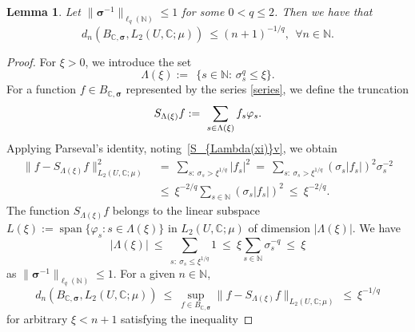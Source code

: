 \documentclass[11pt]{article}
\newtheorem{lemma}{Lemma}[section]
\numberwithin{equation}{section}
\theoremstyle{definition}
\theoremstyle{remark}
\newcommand{\bsigma}{{\boldsymbol{\sigma}}}
\def\NN{{\mathbb N}}
\def\CC{{\mathbb C}}
\def\CC{{\mathbb C}}
\def\NN{{\mathbb N}}
\def\CC{{\mathbb C}}
\def\NN{{\mathbb N}}
\begin{document}
{
\begin{lemma} \label{lemma:d_n><}
Let $\|\bsigma^{-1}\|_{\ell_q(\NN)} \le 1$ for some $0 < q \le 2$.	Then we have that
	\begin{equation} \label{d_n><}
		d_n(B_{\CC,\bsigma},L_2(U,\CC;\mu))
        \ \le (n+1)^{-1/q}, \ \ \forall n \in \NN.
	\end{equation}
\end{lemma}	

\begin{proof}	
	For $\xi>0$, we introduce the set 	
	\begin{equation*} \label{Lambda_sigma(xi)}
\Lambda(\xi)
	:= \ 
	\ \big\{s \in \NN: \, \sigma_s^{q} \le \xi \big\}.
\end{equation*}
 For a function $f \in B_{\CC,\bsigma}$
	represented by the series \eqref{series}, we define the truncation 
	\begin{equation} \label{S_{Lambda(xi)}v}
		S_{\Lambda(\xi)} f 
		:= \ 
		\sum_{s\in {\Lambda(\xi)}} f_s \varphi_s.
	\end{equation}	
	Applying Parseval's identity, 
	noting~\eqref{S_{Lambda(xi)}v}, we obtain 
		\begin{equation} \nonumber
		\begin{split}
			\|f- S_{\Lambda(\xi)}f\|_{L_2(U,\CC;\mu)}^2 
			\ & {=} \
            \sum_{s: \ \sigma_{s}> \xi^{1/q} } |f_s|^2 
			\ = \
            \sum_{s: \ \sigma_{s}> \xi^{1/q} } (\sigma_{s}|f_s|)^2 \sigma_{s}^{-2}
			\\[1.5ex]
			\ &\le \
			\xi^{-2/q}
			\sum_{s \in \NN} (\sigma_{s}|f_s|)^2 
			\ \le \ \xi^{-2/q}.
		\end{split}
	\end{equation} 
The function $S_{\Lambda(\xi)}f$ belongs to the linear subspace 
$L(\xi):= \operatorname{span}\{\varphi_s: s \in \Lambda(\xi)\}$ in $L_2(U,\CC;\mu)$ of dimension $|\Lambda(\xi)|$. We have
\begin{equation} \nonumber
	|\Lambda(\xi)|
	\ \le \ 
    \sum_{s: \ \sigma_{s}\le \xi^{1/q} } 1
	\ \le \ 
	\xi \sum_{s \in \NN} \sigma_s^{-q} 
	\ \le \ \xi
\end{equation}
as $\|\bsigma^{-1}\|_{\ell_q(\NN)} \le 1$. 
For a given $n \in \NN$, 
	\begin{equation} \nonumber
			d_n(B_{\CC,\bsigma},L_2(U,\CC;\mu))
			\ \le \
        \sup_{f\in B_{\CC,\bsigma}}\|f- S_{\Lambda(\xi)}f\|_{L_2(U,\CC;\mu)} 
		\ \le \
		\xi^{-1/q}
\end{equation} 
for arbitrary  $\xi < n+1$ satisfying the inequality 

\end{proof}}
\end{document}
